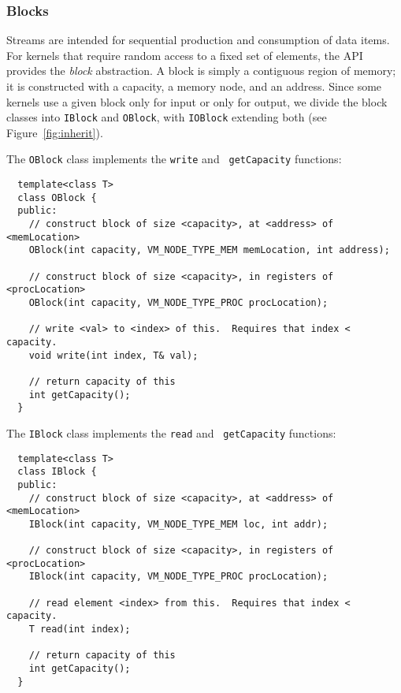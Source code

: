 
\subsubsection{Blocks}
\label{sec:blocks}

Streams are intended for sequential production and consumption of data
items.  For kernels that require random access to a fixed set of
elements, the API provides the {\it block} abstraction.  A block is
simply a contiguous region of memory; it is constructed with a
capacity, a memory node, and an address.  Since some kernels use a
given block only for input or only for output, we divide the block
classes into {\tt IBlock} and {\tt OBlock}, with {\tt IOBlock}
extending both (see Figure~\ref{fig:inherit}).

The {\tt OBlock} class implements the {\tt write} and {\tt
getCapacity} functions:

{\small
\begin{verbatim}
  template<class T>
  class OBlock {
  public:
    // construct block of size <capacity>, at <address> of <memLocation>
    OBlock(int capacity, VM_NODE_TYPE_MEM memLocation, int address);

    // construct block of size <capacity>, in registers of <procLocation>
    OBlock(int capacity, VM_NODE_TYPE_PROC procLocation);

    // write <val> to <index> of this.  Requires that index < capacity.
    void write(int index, T& val);

    // return capacity of this
    int getCapacity();
  }
\end{verbatim}}

\noindent The {\tt IBlock} class implements the {\tt read} and {\tt
getCapacity} functions:

{\small
\begin{verbatim}
  template<class T>
  class IBlock {
  public:
    // construct block of size <capacity>, at <address> of <memLocation>
    IBlock(int capacity, VM_NODE_TYPE_MEM loc, int addr);

    // construct block of size <capacity>, in registers of <procLocation>
    IBlock(int capacity, VM_NODE_TYPE_PROC procLocation);

    // read element <index> from this.  Requires that index < capacity.
    T read(int index);

    // return capacity of this
    int getCapacity();
  }
\end{verbatim}}

